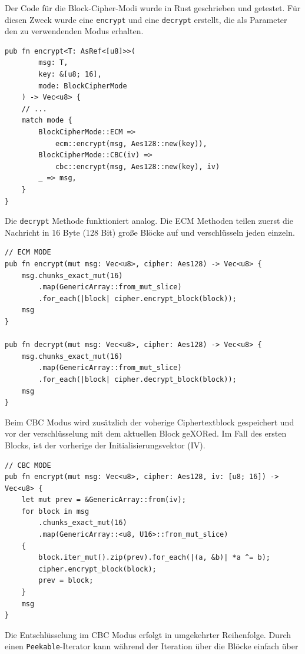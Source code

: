 Der Code für die Block-Cipher-Modi wurde in Rust geschrieben und getestet. 
Für diesen Zweck wurde eine \texttt{encrypt} und eine \texttt{decrypt} erstellt,
die als Parameter den zu verwendenden Modus erhalten. 
\begin{verbatim}
pub fn encrypt<T: AsRef<[u8]>>(
        msg: T, 
        key: &[u8; 16], 
        mode: BlockCipherMode
    ) -> Vec<u8> {
    // ...
    match mode {
        BlockCipherMode::ECM => 
            ecm::encrypt(msg, Aes128::new(key)),
        BlockCipherMode::CBC(iv) => 
            cbc::encrypt(msg, Aes128::new(key), iv)
        _ => msg,
    }
}
\end{verbatim}
Die \texttt{decrypt} Methode funktioniert analog. Die ECM Methoden
teilen zuerst die Nachricht in 16 Byte (128 Bit) große Blöcke auf und verschlüsseln
jeden einzeln.
\begin{verbatim}
// ECM MODE
pub fn encrypt(mut msg: Vec<u8>, cipher: Aes128) -> Vec<u8> {
    msg.chunks_exact_mut(16)
        .map(GenericArray::from_mut_slice)
        .for_each(|block| cipher.encrypt_block(block));
    msg
}

pub fn decrypt(mut msg: Vec<u8>, cipher: Aes128) -> Vec<u8> {
    msg.chunks_exact_mut(16)
        .map(GenericArray::from_mut_slice)
        .for_each(|block| cipher.decrypt_block(block));
    msg
}
\end{verbatim}
Beim CBC Modus wird zusätzlich der voherige Ciphertextblock gespeichert und vor der
verschlüsselung mit dem aktuellen Block geXORed. Im Fall des ersten Blocks, ist der
vorherige der Initialisierungsvektor (IV).
\begin{verbatim}
// CBC MODE
pub fn encrypt(mut msg: Vec<u8>, cipher: Aes128, iv: [u8; 16]) -> Vec<u8> {
    let mut prev = &GenericArray::from(iv);
    for block in msg
        .chunks_exact_mut(16)
        .map(GenericArray::<u8, U16>::from_mut_slice)
    {
        block.iter_mut().zip(prev).for_each(|(a, &b)| *a ^= b);
        cipher.encrypt_block(block);
        prev = block;
    }
    msg
}
\end{verbatim}
Die Entschlüsselung im CBC Modus erfolgt in umgekehrter Reihenfolge. Durch einen
\texttt{Peekable}-Iterator kann während der Iteration über die Blöcke einfach über
